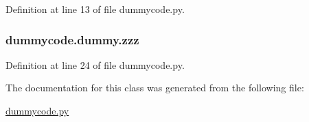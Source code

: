 Definition at line 13 of file dummycode.\-py.

\subsubsection[{zzz}]{\setlength{\rightskip}{0pt plus 5cm}dummycode.\-dummy.\-zzz}\label{classdummycode_1_1dummy_a7557747db5bce912c99cd4f7505f57dd}


Definition at line 24 of file dummycode.\-py.



The documentation for this class was generated from the following file\-:\begin{DoxyCompactItemize}
\item 
\hyperlink{dummycode_8py}{dummycode.\-py}\end{DoxyCompactItemize}
